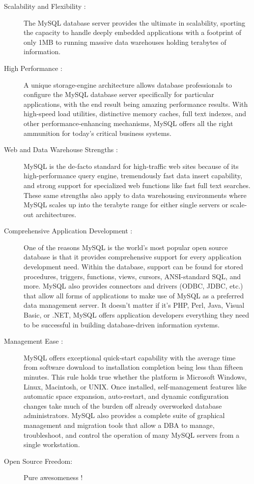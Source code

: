 \begin{description}
\item[Scalability and Flexibility :] 
The MySQL database server provides the ultimate in scalability, sporting the capacity to handle deeply embedded applications with a footprint of only 1MB to running massive data warehouses holding terabytes of information.

\item[High Performance :]
A unique storage-engine architecture allows database professionals to configure the MySQL database server specifically for particular applications, with the end result being amazing performance results. With high-speed load utilities, distinctive memory caches, full text indexes, and other performance-enhancing mechanisms, MySQL offers all the right ammunition for today's critical business systems.

\item[Web and Data Warehouse Strengths :]
MySQL is the de-facto standard for high-traffic web sites because of its high-performance query engine, tremendously fast data insert capability, and strong support for specialized web functions like fast full text searches. These same strengths also apply to data warehousing environments where MySQL scales up into the terabyte range for either single servers or scale-out architectures. 

\item[Comprehensive Application Development :]
One of the reasons MySQL is the world's most popular open source database is that it provides comprehensive support for every application development need. Within the database, support can be found for stored procedures, triggers, functions, views, cursors, ANSI-standard SQL, and more. MySQL also provides connectors and drivers (ODBC, JDBC, etc.) that allow all forms of applications to make use of MySQL as a preferred data management server. It doesn't matter if it's PHP, Perl, Java, Visual Basic, or .NET, MySQL offers application developers everything they need to be successful in building database-driven information systems.

\item[Management Ease :]
MySQL offers exceptional quick-start capability with the average time from software download to installation completion being less than fifteen minutes. This rule holds true whether the platform is Microsoft Windows, Linux, Macintosh, or UNIX. Once installed, self-management features like automatic space expansion, auto-restart, and dynamic configuration changes take much of the burden off already overworked database administrators. MySQL also provides a complete suite of graphical management and migration tools that allow a DBA to manage, troubleshoot, and control the operation of many MySQL servers from a single workstation. 

\item[Open Source Freedom:]
Pure awesomeness !
\end{description}
